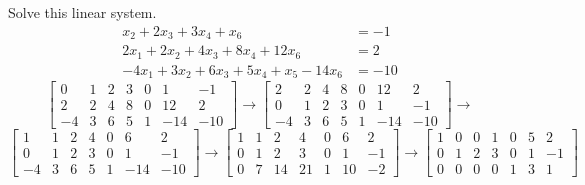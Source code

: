 \documentclass[12pt]{article}
\begin{document}
\begin{example} Solve this linear system. $$ \begin{aligned} x_2 + 2x_3 + 3x_4 + x_6 &= -1 \\ 2x_1 + 2x_2 + 4x_3 + 8x_4 + 12x_6 &= 2 \\ -4x_1  + 3x_2 + 6x_3 + 5x_4 + x_5 - 14x_6 &= -10 \end{aligned} $$
$$ \begin{bmatrix} 0 & 1 & 2 & 3 & 0 & 1 & -1 \\ 2 & 2 & 4 & 8 & 0 & 12 & 2 \\ -4 & 3 & 6 & 5 & 1 & -14 & -10 \end{bmatrix} \rightarrow 
\begin{bmatrix} 2 & 2 & 4 & 8 & 0 & 12 & 2 \\ 0 & 1 & 2 & 3 & 0 & 1 & -1 \\ -4 & 3 & 6 & 5 & 1 & -14 & -10 \end{bmatrix} \rightarrow $$
$$ \begin{bmatrix} 1 & 1 & 2 & 4 & 0 & 6 & 2 \\ 0 & 1 & 2 & 3 & 0 & 1 & -1 \\ -4 & 3 & 6 & 5 & 1 & -14 & -10 \end{bmatrix} \rightarrow 
 \begin{bmatrix} 1 & 1 & 2 & 4 & 0 & 6 & 2 \\ 0 & 1 & 2 & 3 & 0 & 1 & -1 \\ 0 & 7 & 14 & 21 & 1 & 10 & -2 \end{bmatrix} \rightarrow 
 \begin{bmatrix} 1 & 0 & 0 & 1 & 0 & 5 & 2 \\ 0 & 1 & 2 & 3 & 0 & 1 & -1 \\ 0 & 0 & 0 & 0 & 1 & 3 & 1 \end{bmatrix} $$ \end{example} 
\end{document}
